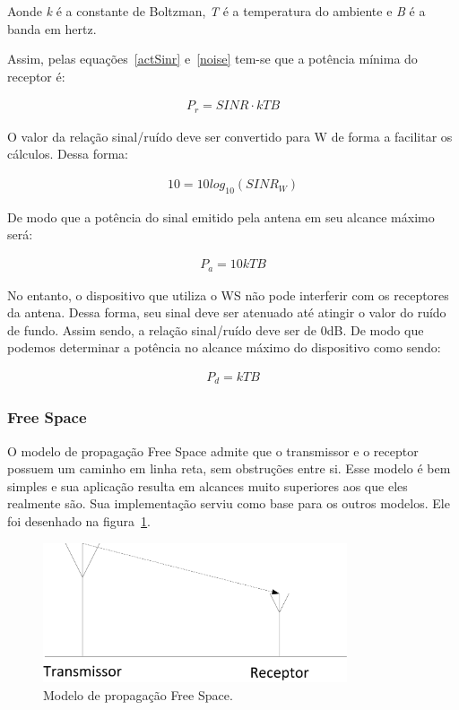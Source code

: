 Aonde \textit{k} é a constante de Boltzman, \textit{T} é a temperatura do ambiente e \textit{B} é a banda em hertz.

Assim, pelas equações~\ref{actSinr} e~\ref{noise} tem-se que a potência mínima do receptor é:

\begin{align}
  \label{minPot} P_r= SINR \cdot  kTB
\end{align}

O valor da relação sinal/ruído deve ser convertido para W de forma a facilitar os cálculos. Dessa forma:

\begin{align}
  \label{SinrW} 10= 10 log_{10} (SINR_W)
\end{align}

De modo que a potência do sinal emitido pela antena em seu alcance máximo será:

\begin{align}
  \label{minPotAnt} P_{a}= 10kTB
\end{align}

 No entanto, o dispositivo que utiliza o WS não pode interferir com os receptores da antena. Dessa forma, seu sinal deve ser atenuado até atingir o valor do ruído de fundo. Assim sendo, a relação sinal/ruído deve ser de 0dB. De modo que podemos determinar a potência no alcance máximo do dispositivo como sendo:

\begin{align}
  \label{minPotDev} P_{d}=  kTB
\end{align}

\subsubsection{Free Space}

O modelo de propagação Free Space admite que o transmissor e o receptor possuem um caminho em linha reta, sem obstruções entre si. Esse modelo é bem simples e sua aplicação resulta em alcances muito superiores aos que eles realmente são. Sua implementação serviu como base para os outros modelos. Ele foi desenhado na figura~\ref{fig:freespaces}.

\begin{figure}[htb]
\centering
\includegraphics[width=0.8\textwidth]{figs/freespaces}
\caption[Modelo de propagação Free Space.]
{Modelo de propagação Free Space.}
\label{fig:freespaces}
\end{figure}

